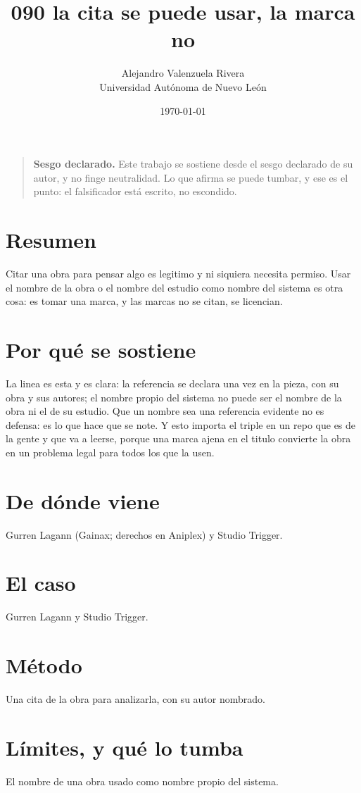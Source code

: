 \documentclass[11pt,a4paper]{article}
\title{090 la cita se puede usar, la marca no}
\author{Alejandro Valenzuela Rivera\\\small Universidad Autónoma de Nuevo León}
\date{\today}
\begin{document}
\maketitle

\begin{quote}
\textbf{Sesgo declarado.} Este trabajo se sostiene desde el sesgo declarado de su autor, y no finge neutralidad. Lo que afirma se puede tumbar, y ese es el punto: el falsificador está escrito, no escondido.
\end{quote}

\section*{Resumen}
Citar una obra para pensar algo es legitimo y ni siquiera necesita permiso. Usar el nombre de la obra o el nombre del estudio como nombre del sistema es otra cosa: es tomar una marca, y las marcas no se citan, se licencian.

\section{Por qué se sostiene}
La linea es esta y es clara: la referencia se declara una vez en la pieza, con su obra y sus autores; el nombre propio del sistema no puede ser el nombre de la obra ni el de su estudio. Que un nombre sea una referencia evidente no es defensa: es lo que hace que se note. Y esto importa el triple en un repo que es de la gente y que va a leerse, porque una marca ajena en el titulo convierte la obra en un problema legal para todos los que la usen.

\section{De dónde viene}
Gurren Lagann (Gainax; derechos en Aniplex) y Studio Trigger.

\section{El caso}
Gurren Lagann y Studio Trigger.

\section{Método}
Una cita de la obra para analizarla, con su autor nombrado.

\section{Límites, y qué lo tumba}
El nombre de una obra usado como nombre propio del sistema.
\end{document}
